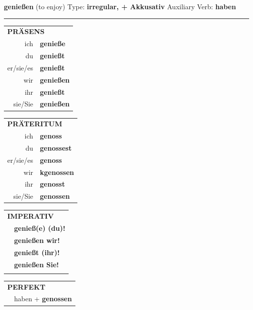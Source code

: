 \documentclass[10pt,a4paper]{revtex4-2}
\begin{document}
\begin{verbbox-acc}
    {\Large \bf genießen} (to enjoy) \hfill Type: \textbf{irregular, + Akkusativ} \hfill Auxiliary Verb: \textbf{haben} 
    
     \vspace{5pt}

    \hrule
    
    \vspace{5pt}

  \begin{tabular}{rl}
     \multicolumn{2}{l}{\textbf{PRÄSENS} }\\
    ich & \textbf{genieße}\\
    du & \textbf{genießt}\\
    er/sie/es & \textbf{genießt}\\
    wir & \textbf{genießen}\\
    ihr & \textbf{genießt}\\
    sie/Sie & \textbf{genießen}\\
  \end{tabular}
  \hfill
     \begin{tabular}{rl}
    \multicolumn{2}{l}{\textbf{PRÄTERITUM} }\\
    ich & \textbf{genoss}\\
    du & \textbf{genossest}\\
    er/sie/es & \textbf{genoss}\\
    wir & \textbf{kgenossen}\\
    ihr & \textbf{genosst}\\
    sie/Sie & \textbf{genossen}\\
  \end{tabular}
  \hfill
  \begin{tabular}{rl}
     \multicolumn{2}{l}{\textbf{IMPERATIV} }\\
   & \textbf{genieß(e) (du)!}\\
   & \textbf{genießen wir!}\\
   & \textbf{genießt (ihr)!}\\
   & \textbf{genießen Sie!}\\
   & \vspace{10pt}
  \end{tabular}

    \vspace{10pt}

 \begin{tabular}{rl}
     \multicolumn{2}{l}{\textbf{PERFEKT}}\\
  &  haben + \textbf{genossen}\\
  \end{tabular}
\hfill
   \begin{tabular}{rl}
   

\end{tabular}
\end{verbbox-acc}
\end{document}
